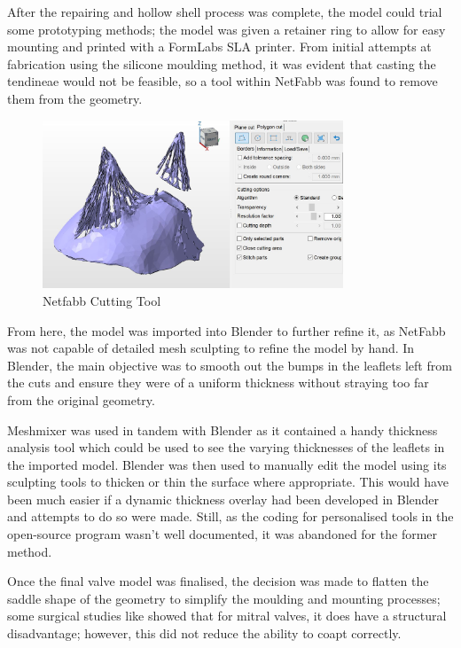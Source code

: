 After the repairing and hollow shell process was complete, the model could trial some prototyping methods; the model was given a retainer ring to allow for easy mounting and printed with a FormLabs \gls{SLA} printer. From initial attempts at fabrication using the silicone moulding method, it was evident that casting the tendineae would not be feasible, so a tool within NetFabb was found to remove them from the geometry.
\begin{figure}
    \centering
    \includegraphics[width=0.8\textwidth]{figures/nfcut}
    \caption{Netfabb Cutting Tool}
    \label{fig:Netfabbcut}
\end{figure}

From here, the model was imported into Blender to further refine it, as NetFabb was not capable of detailed mesh sculpting to refine the model by hand. In Blender, the main objective was to smooth out the bumps in the leaflets left from the cuts and ensure they were of a uniform thickness without straying too far from the original geometry.

Meshmixer was used in tandem with Blender as it contained a handy thickness analysis tool which could be used to see the varying thicknesses of the leaflets in the imported model. Blender was then used to manually edit the model using its sculpting tools to thicken or thin the surface where appropriate. This would have been much easier if a dynamic thickness overlay had been developed in Blender and attempts to do so were made. Still, as the coding for personalised tools in the open-source program wasn't well documented, it was abandoned for the former method.





Once the final valve model was finalised, the decision was made to flatten the saddle shape of the geometry to simplify the moulding and mounting processes; some surgical studies like  showed that for mitral valves, it does have a structural disadvantage; however, this did not reduce the ability to coapt correctly.



